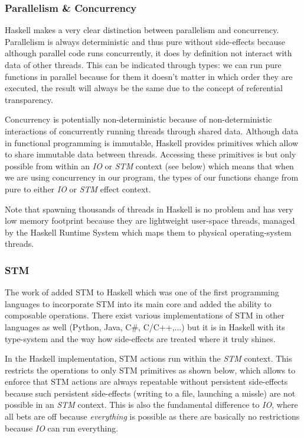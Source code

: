 \subsubsection{Parallelism \& Concurrency}
Haskell makes a very clear distinction between parallelism and concurrency. Parallelism is always deterministic and thus pure without side-effects because although parallel code runs concurrently, it does by definition not interact with data of other threads. This can be indicated through types: we can run pure functions in parallel because for them it doesn't matter in which order they are executed, the result will always be the same due to the concept of referential transparency.

Concurrency is potentially non-deterministic because of non-deterministic interactions of concurrently running threads through shared data. Although data in functional programming is immutable, Haskell provides primitives which allow to share immutable data between threads. Accessing these primitives is but only possible from within an \textit{IO} or \textit{STM} context (see below) which means that when we are using concurrency in our program, the types of our functions change from pure to either \textit{IO} or \textit{STM} effect context.

Note that spawning thousands of threads in Haskell is no problem and has very low memory footprint because they are lightweight user-space threads, managed by the Haskell Runtime System which maps them to physical operating-system threads. 

\subsubsection{STM}
The work of \cite{harris_composable_2005, harris_transactional_2006} added STM to Haskell which was one of the first programming languages to incorporate STM into its main core and added the ability to composable operations. There exist various implementations of STM in other languages as well (Python, Java, C\#, C/C++,...) but it is in Haskell with its type-system and the way how side-effects are treated where it truly shines.

In the Haskell implementation, STM actions run within the \textit{STM} context. This restricts the operations to only STM primitives as shown below, which allows to enforce that STM actions are always repeatable without persistent side-effects because such persistent side-effects (writing to a file, launching a missle) are not possible in an \textit{STM} context. This is also the fundamental difference to  \textit{IO}, where all bets are off because \textit{everything} is possible as there are basically no restrictions because \textit{IO} can run everything.

